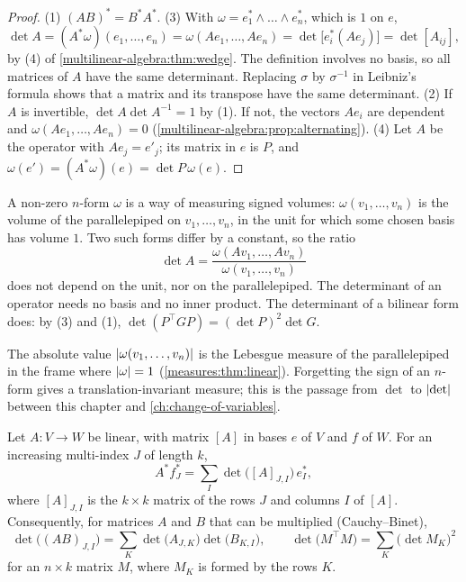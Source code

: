 \begin{notechapter}
\begin{proof}
(1) $(AB)^* = B^*A^*$. (3) With
$\omega = e_1^*\wedge\dots\wedge e_n^*$, which is $1$ on $e$,
\[
  \det A = (A^*\omega)(e_1,\dots,e_n) = \omega(Ae_1,\dots,Ae_n)
  = \det\bigl[e_i^*(Ae_j)\bigr] = \det[A_{ij}] ,
\]
by (4) of \cref{multilinear-algebra:thm:wedge}. The definition involves
no basis, so all matrices of $A$ have the same determinant. Replacing
$\sigma$ by $\sigma^{-1}$ in Leibniz's formula shows that a matrix and
its transpose have the same determinant. (2) If $A$ is invertible,
$\det A\det A^{-1} = 1$ by (1). If not, the vectors $Ae_i$ are
dependent and $\omega(Ae_1,\dots,Ae_n) = 0$
(\cref{multilinear-algebra:prop:alternating}). (4) Let $A$ be the
operator with $Ae_j = e'_j$; its matrix in $e$ is $P$, and
$\omega(e') = (A^*\omega)(e) = \det P\,\omega(e)$.
\end{proof}

\begin{keyidea}
A non-zero $n$-form $\omega$ is a way of measuring signed volumes:
$\omega(v_1,\dots,v_n)$ is the volume of the parallelepiped on
$v_1,\dots,v_n$, in the unit for which some chosen basis has volume
$1$. Two such forms differ by a constant, so the ratio
\[
  \det A = \frac{\omega(Av_1,\dots,Av_n)}{\omega(v_1,\dots,v_n)}
\]
does not depend on the unit, nor on the parallelepiped. The determinant
of an operator needs no basis and no inner product. The determinant of a
bilinear form does: by (3) and (1),
$\det(P^\top GP) = (\det P)^2\det G$.
\end{keyidea}

The absolute value $\left|\omega(v_1,\dots,v_n)\right|$ is the Lebesgue measure
of the parallelepiped in the frame where $\left|\omega\right| = 1$
(\cref{measures:thm:linear}). Forgetting the sign of an $n$-form gives a
translation-invariant measure; this is the passage from $\det$ to
$\left|\det\right|$ between this chapter and \cref{ch:change-of-variables}.

\begin{proposition}[Minors]\label{multilinear-algebra:prop:minors}
Let $A:V\to W$ be linear, with matrix $[A]$ in bases $e$ of $V$ and $f$
of $W$. For an increasing multi-index $J$ of length $k$,
\[
  A^*f_J^* = \sum_I\det\bigl([A]_{J, I}\bigr)\,e_I^* ,
\]
where $[A]_{J, I}$ is the $k\times k$ matrix of the rows $J$ and columns
$I$ of $[A]$. Consequently, for matrices $A$ and $B$ that can be
multiplied (Cauchy--Binet),
\[
  \det\bigl((AB)_{J, I}\bigr)
  = \sum_K\det\bigl(A_{J, K}\bigr)\det\bigl(B_{K, I}\bigr) ,
  \qquad
  \det\bigl(M^\top M\bigr) = \sum_K\bigl(\det M_K\bigr)^2
\]
for an $n\times k$ matrix $M$, where $M_K$ is formed by the rows $K$.
\end{proposition}


\end{notechapter}
